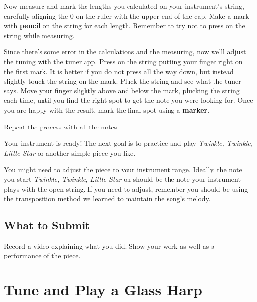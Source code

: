 \documentclass[12pt,noauthor,nooutcomes,hints,instructornotes]{ximera}%
\begin{document}
\begin{question}
Now measure and mark the lengths you calculated on your instrument's string, carefully aligning the 0 on the ruler with the upper end of the cap. Make a mark with \textbf{pencil} on the string for each length. Remember to try not to press on the string while measuring.
\end{question}

\begin{question}
Since there's some error in the calculations and the measuring, now we'll adjust the tuning with the tuner app. Press on the string putting your finger right on the first mark. It is better if you do not press all the way down, but instead slightly touch the string on the mark. Pluck the string and see what the tuner says. Move your finger slightly above and below the mark, plucking the string each time, until you find the right spot to get the note you were looking for. Once you are happy with the result, mark the final spot using a \textbf{marker}.

Repeat the process with all the notes.
\end{question}

\begin{question}
Your instrument is ready! The next goal is to practice and play \textit{Twinkle, Twinkle, Little Star} or another simple piece you like. 
\end{question}

\begin{question}
You might need to adjust the piece to your instrument range. Ideally, the note you start \textit{Twinkle, Twinkle, Little Star} on should be the note your instrument plays with the open string. If you need to adjust, remember you should be using the transposition method we learned to maintain the song's melody.
\end{question}

\subsection{What to Submit}

Record a video explaining what you did. Show your work as well as a performance of the piece.


\newpage

\section{Tune and Play a Glass Harp}
\end{document}
